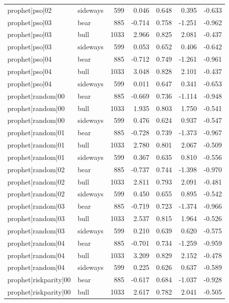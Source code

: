 \begin{table}
\begin{tabular}{llrrrrr}
prophet|pso|02 & sideways & 599 & 0.046 & 0.648 & 0.395 & -0.633 \\
prophet|pso|03 & bear & 885 & -0.714 & 0.758 & -1.251 & -0.962 \\
prophet|pso|03 & bull & 1033 & 2.966 & 0.825 & 2.081 & -0.437 \\
prophet|pso|03 & sideways & 599 & 0.053 & 0.652 & 0.406 & -0.642 \\
prophet|pso|04 & bear & 885 & -0.712 & 0.749 & -1.261 & -0.961 \\
prophet|pso|04 & bull & 1033 & 3.048 & 0.828 & 2.101 & -0.437 \\
prophet|pso|04 & sideways & 599 & 0.011 & 0.647 & 0.341 & -0.653 \\
prophet|random|00 & bear & 885 & -0.669 & 0.736 & -1.114 & -0.948 \\
prophet|random|00 & bull & 1033 & 1.935 & 0.803 & 1.750 & -0.541 \\
prophet|random|00 & sideways & 599 & 0.476 & 0.624 & 0.937 & -0.547 \\
prophet|random|01 & bear & 885 & -0.728 & 0.739 & -1.373 & -0.967 \\
prophet|random|01 & bull & 1033 & 2.780 & 0.801 & 2.067 & -0.509 \\
prophet|random|01 & sideways & 599 & 0.367 & 0.635 & 0.810 & -0.556 \\
prophet|random|02 & bear & 885 & -0.737 & 0.744 & -1.398 & -0.970 \\
prophet|random|02 & bull & 1033 & 2.811 & 0.793 & 2.091 & -0.481 \\
prophet|random|02 & sideways & 599 & 0.450 & 0.655 & 0.895 & -0.542 \\
prophet|random|03 & bear & 885 & -0.719 & 0.723 & -1.374 & -0.966 \\
prophet|random|03 & bull & 1033 & 2.537 & 0.815 & 1.964 & -0.526 \\
prophet|random|03 & sideways & 599 & 0.210 & 0.639 & 0.620 & -0.575 \\
prophet|random|04 & bear & 885 & -0.701 & 0.734 & -1.259 & -0.959 \\
prophet|random|04 & bull & 1033 & 3.209 & 0.829 & 2.152 & -0.478 \\
prophet|random|04 & sideways & 599 & 0.225 & 0.626 & 0.637 & -0.589 \\
prophet|riskparity|00 & bear & 885 & -0.617 & 0.684 & -1.037 & -0.928 \\
prophet|riskparity|00 & bull & 1033 & 2.617 & 0.782 & 2.041 & -0.505 \\

\end{tabular}
\end{table}
